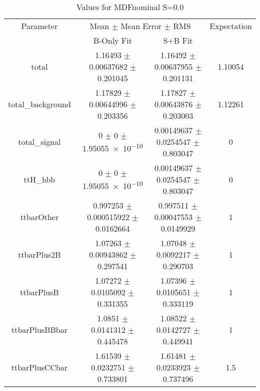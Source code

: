 \begin{table}
\centering
\caption{Values for MDFnominal S=0.0}
\begin{tabular}{cccc}
\toprule
Parameter & \multicolumn{2}{c}{Mean $\pm$ Mean Error $\pm$ RMS} & Expectation\\
 & B-Only Fit & S+B Fit & \\
\midrule
total & \num{1.16493} $\pm$ \num{0.00637682} $\pm$ \num{0.201045} & \num{1.16492} $\pm$ \num{0.00637955} $\pm$ \num{0.201131} & \num{1.10054}\\
total\_background & \num{1.17829} $\pm$ \num{0.00644996} $\pm$ \num{0.203356} & \num{1.17827} $\pm$ \num{0.00643876} $\pm$ \num{0.203003} & \num{1.12261}\\
total\_signal & \num{0} $\pm$ \num{0} $\pm$ \num{1.95055e-10} & \num{0.00149637} $\pm$ \num{0.0254547} $\pm$ \num{0.803047} & \num{0}\\
ttH\_hbb & \num{0} $\pm$ \num{0} $\pm$ \num{1.95055e-10} & \num{0.00149637} $\pm$ \num{0.0254547} $\pm$ \num{0.803047} & \num{0}\\
ttbarOther & \num{0.997253} $\pm$ \num{0.000515922} $\pm$ \num{0.0162664} & \num{0.997511} $\pm$ \num{0.00047553} $\pm$ \num{0.0149929} & \num{1}\\
ttbarPlus2B & \num{1.07263} $\pm$ \num{0.00943862} $\pm$ \num{0.297541} & \num{1.07048} $\pm$ \num{0.0092217} $\pm$ \num{0.290703} & \num{1}\\
ttbarPlusB & \num{1.07272} $\pm$ \num{0.0105092} $\pm$ \num{0.331355} & \num{1.07396} $\pm$ \num{0.0105651} $\pm$ \num{0.333119} & \num{1}\\
ttbarPlusBBbar & \num{1.0851} $\pm$ \num{0.0141312} $\pm$ \num{0.445478} & \num{1.08522} $\pm$ \num{0.0142727} $\pm$ \num{0.449941} & \num{1}\\
ttbarPlusCCbar & \num{1.61539} $\pm$ \num{0.0232751} $\pm$ \num{0.733801} & \num{1.61481} $\pm$ \num{0.0233923} $\pm$ \num{0.737496} & \num{1.5}\\
\bottomrule
\end{tabular}
\end{table}